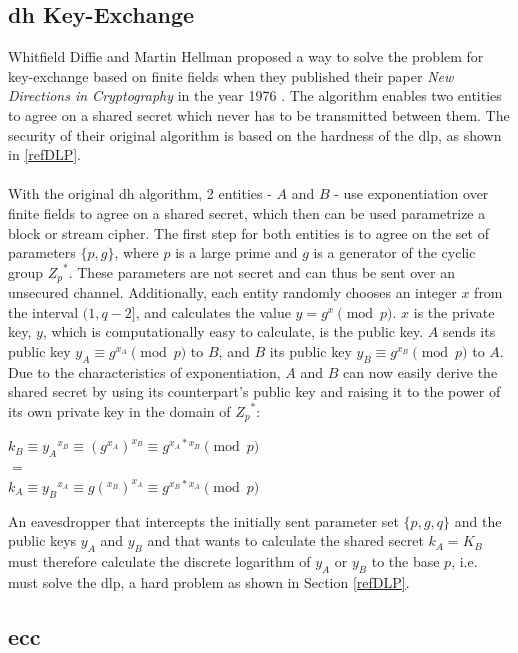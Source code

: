 \subsection{\gls{dh} Key-Exchange}

Whitfield Diffie and Martin Hellman proposed a way to solve the problem for key-exchange based on finite fields
when they published their paper \textit{New Directions in Cryptography} in the year 1976 \cite{1055638}. The algorithm enables two entities to agree on a 
shared secret which never has to be transmitted between them. The security of their original algorithm
is based on the hardness of the \gls{dlp}, as shown in \ref{refDLP}.
\\
\\
With the original \gls{dh} algorithm, 2 entities - $A$ and $B$ - use exponentiation over finite fields to agree on a shared secret, which
then can be used parametrize a block or stream cipher. The first step for both entities is to agree on the set of parameters $\{p, g\}$, where $p$ is a 
large prime and $g$ is a generator of the cyclic group ${Z_p}^*$. These parameters are not secret and
can thus be sent over an unsecured channel.
Additionally, each entity randomly chooses an integer $x$ from the interval $(1, q-2]$, and calculates the value $y = g^x \pmod p$. $x$ is the private key,
$y$, which is computationally easy to calculate, is the public key. $A$ sends its public key $y_A \equiv g^{x_A} \pmod p$ to $B$, and $B$ its public key
$y_B \equiv g^{x_B} \pmod p$ to $A$. Due to the characteristics of exponentiation, $A$ and $B$ can now easily derive the shared secret by using its counterpart's
public key and raising it to the power of its own private key in the domain of ${Z_p}^*$:

\begin{center}
 $k_B \equiv {y_A}^{x_B} \equiv (g^{x_A})^{x_B} \equiv g^{x_A*x_B} \pmod p $\\
 $ = $ \\
 $ k_A \equiv {y_B}^{x_A} \equiv g(^{x_B})^{x_A} \equiv g^{x_B*x_A} \pmod p $
\end{center}
An eavesdropper that intercepts the initially sent parameter set $\{p, g, q\}$ and the public keys $y_A$ and $y_B$ and that wants to calculate the shared secret
$k_A = K_B$  must therefore calculate the discrete logarithm of $y_A$ or $y_B$ to the base $p$, i.e. must solve the \gls{dlp}, a hard problem as shown in
Section \ref{refDLP}.
\\

\subsection{\gls{ecc}}

